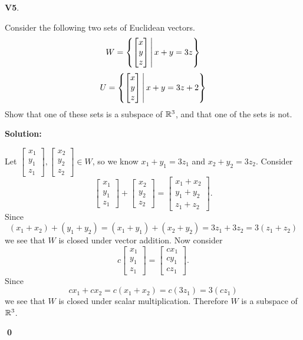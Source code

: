 \documentclass{article}
\newenvironment{problem}[1]
{
  \begin{flushleft}
  \textbf{#1}.
  \ignorespaces
}
{
  \end{flushleft}
}
\newenvironment{solution}
{
  \ignorespaces
  \textbf{Solution:}
}
{
  \ignorespacesafterend
  \begin{flushright}
  {\bfseries \qed}
  \end{flushright}
}
\begin{document}
\begin{problem}{V5}
Consider the following two sets of Euclidean vectors.
\[
  W = \left\{\begin{bmatrix} x \\ y \\ z \end{bmatrix}\,\middle|\,x+y=3z\right\}
\]
\[
  U = \left\{\begin{bmatrix} x \\ y \\ z \end{bmatrix}\,\middle|\,x+y=3z+2\right\}
\]
Show that one of these sets is a subspace of \(\mathbb{R}^3\), and
that one of the sets is not.
\end{problem}
\begin{solution}
Let
\(
  \begin{bmatrix} x_1 \\y_1 \\ z_1 \end{bmatrix},
  \begin{bmatrix} x_2 \\y_2 \\ z_2 \end{bmatrix} \in W
\),
so we know \(x_1+y_1=3z_1\) and \(x_2+y_2=3z_2\).
Consider
\[
\begin{bmatrix} x_1 \\y_1 \\ z_1 \end{bmatrix}
+\begin{bmatrix} x_2 \\y_2 \\ z_2 \end{bmatrix}
=\begin{bmatrix} x_1+x_2 \\y_1+y_2 \\ z_1+z_2 \end{bmatrix}
.\]
Since
\[
  (x_1+x_2)+(y_1+y_2) = (x_1+y_1)+(x_2+y_2) = 3z_1+3z_2=3(z_1+z_2)
\]
we see that \(W\) is closed under vector addition.
Now consider
\[
c\begin{bmatrix} x_1 \\y_1 \\ z_1 \end{bmatrix}
=\begin{bmatrix} cx_1 \\cy_1 \\ cz_1 \end{bmatrix}
.\]
Since
\[cx_1+cx_2 = c(x_1+x_2)=c(3z_1)=3(cz_1)\]
we see that \(W\) is closed under scalar multiplication. Therefore \(W\)
is a subspace of \(\mathbb{R}^3\).


\end{solution}
\end{document}
